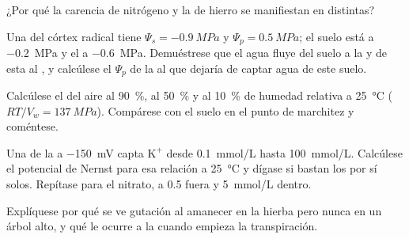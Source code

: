 \begin{exercise}[$\star$]\label{exo:b1:plant-water-minerals:4}
¿Por qué la carencia de nitrógeno y la de hierro se manifiestan en 
distintas?
\end{exercise}

\begin{exercise}[$\star\star$]\label{exo:b1:plant-water-minerals:5}
Una  del córtex radical tiene $\Psi_s = \qty{-0.9}{MPa}$ y $\Psi_p =
\qty{0.5}{MPa}$; el suelo está a \qty{-0.2}{MPa} y el  a
\qty{-0.6}{MPa}. Demuéstrese que el agua fluye del suelo a la  y de
esta al , y calcúlese el $\Psi_p$ de la  al que dejaría de
captar agua de este suelo.
\end{exercise}

\begin{exercise}[$\star\star$]\label{exo:b1:plant-water-minerals:6}
Calcúlese el  del aire al \qty{90}{\%}, al \qty{50}{\%} y
al \qty{10}{\%} de humedad relativa a \qty{25}{\celsius} ($RT/V_w =
\qty{137}{MPa}$). Compárese con el suelo en el punto de marchitez y
coméntese.
\end{exercise}

\begin{exercise}[$\star\star$]\label{exo:b1:plant-water-minerals:7}
Una  de la  a \qty{-150}{mV} capta $\mathrm{K^+}$ desde
\qty{0.1}{mmol/L} hasta \qty{100}{mmol/L}. Calcúlese el potencial de Nernst
para esa relación a \qty{25}{\celsius} y dígase si bastan los  por sí
solos. Repítase para el nitrato, a \qty{0.5}{} fuera y \qty{5}{mmol/L}
dentro.
\end{exercise}

\begin{exercise}[$\star\star$]\label{exo:b1:plant-water-minerals:8}
Explíquese por qué se ve gutación al amanecer en la hierba pero nunca en un
árbol alto, y qué le ocurre a la  cuando empieza la
transpiración.
\end{exercise}

